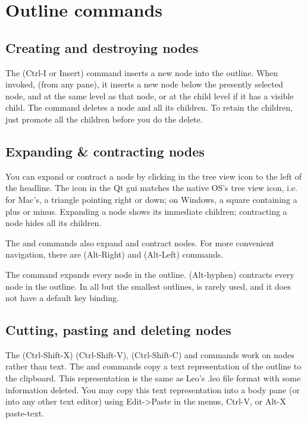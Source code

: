 \documentclass[a4paper,10pt,english]{sphinxmanual}
\begin{document}
\section{Outline commands}
\label{commands:id1}

\subsection{Creating and destroying nodes}
\label{commands:creating-and-destroying-nodes}
The  (Ctrl-I or Insert) command inserts a new node into the
outline. When invoked, (from any pane), it inserts a new node below the
presently selected node, and at the same level as that node, or at the
child level if it has a visible child. The  command deletes
a node and all its children. To retain the children, just promote all the
children before you do the delete.


\subsection{Expanding \& contracting nodes}
\label{commands:expanding-contracting-nodes}
You can expand or contract a node by clicking in the tree view icon to the
left of the headline. The icon in the Qt gui matches the native OS's tree
view icon, i.e. for Mac's, a triangle pointing right or down; on Windows, a
square containing a plus or minus. Expanding a node shows its immediate
children; contracting a node hides all its children.

The  and  commands also expand and contract
nodes. For more convenient navigation, there are 
(Alt-Right) and  (Alt-Left) commands.

The  command expands every node in the outline.
 (Alt-hyphen) contracts every node in the outline. In all
but the smallest outlines,  is rarely used, and it does not
have a default key binding.


\subsection{Cutting, pasting and deleting nodes}
\label{commands:cutting-pasting-and-deleting-nodes}
The  (Ctrl-Shift-X)  (Ctrl-Shift-V),
 (Ctrl-Shift-C) and  commands work on nodes
rather than text. The  and  commands copy a text
representation of the outline to the clipboard. This representation is the
same as Leo's .leo file format with some information deleted. You may copy
this text representation into a body pane (or into any other text editor)
using Edit-\textgreater{}Paste in the menus, Ctrl-V, or Alt-X paste-text.
\end{document}

